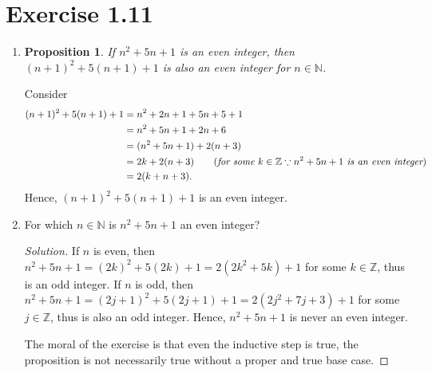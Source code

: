 \documentclass{article}
\newtheorem{proposition}[thm]{Proposition}
\begin{document}
\section*{Exercise 1.11}
\begin{enumerate}[label=(\alph*)]
    \item \begin{proposition}
        If $n^2 + 5n + 1$ is an even integer, then $(n+1)^2 + 5(n+1) + 1$ is also an even integer 
        for $n \in \mathbb{N}$.
    \end{proposition}

    Consider 
    \begin{align*}
        (n+1)^2 + 5(n+1) + 1 & = n^2 + 2n + 1 + 5n + 5 + 1 \\
        & = n^2 + 5n + 1 + 2n + 6 \\
        & = (n^2 + 5n + 1) + 2(n+3) \\
        & = 2k + 2(n+3) \qquad (\emph{for some } k \in \mathbb{Z} \because \emph{$n^2 + 5n + 1$ is 
        an even integer}) \\
        & = 2(k + n + 3).
    \end{align*}
    Hence, $(n+1)^2 + 5(n+1) + 1$ is an even integer.

    \item For which $n \in \mathbb{N}$ is $n^2 + 5n + 1$ an even integer?
    \begin{proof}[Solution]
        If $n$ is even, then $n^2 + 5n + 1 = (2k)^2 + 5(2k) + 1 = 2(2k^2 + 5k) + 1$ for some $k \in 
        \mathbb{Z}$, thus is an odd integer. If $n$ is odd, then $n^2 + 5n + 1 = (2j+1)^2 + 5(2j+1)
        + 1 = 2(2j^2 + 7j + 3) + 1$ for some $j \in \mathbb{Z}$, thus is also an odd integer. 
        Hence, $n^2 + 5n + 1$ is never an even integer.

        The moral of the exercise is that even the inductive step is true, the proposition is not
        necessarily true without a proper and true base case.
    \end{proof}
\end{enumerate}
\end{document}
